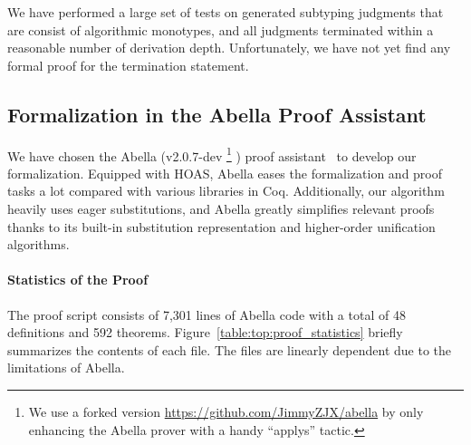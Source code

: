 We have performed a large set of tests on generated subtyping judgments
that are consist of algorithmic monotypes,
and all judgments terminated within a reasonable number of derivation depth.
Unfortunately, we have not yet find any formal proof for the termination statement.

\subsection{Formalization in the Abella Proof Assistant}

We have chosen the Abella (v2.0.7-dev
\footnote{We use a forked version \url{https://github.com/JimmyZJX/abella} by only enhancing the Abella prover with a handy
``applys'' tactic.}
) proof assistant~\citep{AbellaDesc} to develop our formalization.
Equipped with HOAS, Abella eases the formalization and proof tasks a lot
compared with various libraries in Coq.
Additionally, our algorithm heavily uses eager substitutions,
and Abella greatly simplifies relevant proofs thanks to its built-in
substitution representation and higher-order unification algorithms.

\paragraph{Statistics of the Proof}
The proof script consists of 7,301 lines of Abella code with a total of
48 definitions and 592 theorems.
Figure~\ref{table:top:proof_statistics} briefly summarizes the contents of each file.
The files are linearly dependent due to the limitations of Abella.

